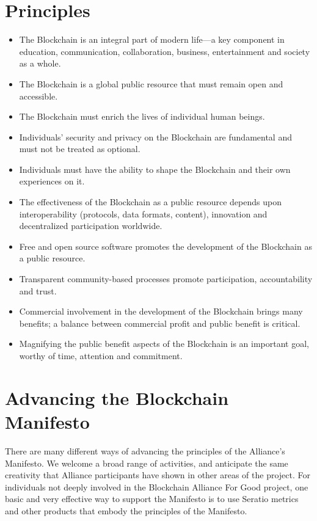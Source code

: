 \documentclass[twoside,twocolumn]{article}
\begin{document}
\section{Principles}
\begin{itemize}
  \item The Blockchain is an integral part of modern life—a key component in
  education, communication, collaboration, business, entertainment and society
  as a whole.
  \item The Blockchain is a global public resource that must remain open and
  accessible.
  \item The Blockchain must enrich the lives of individual human beings.
  \item Individuals’ security and privacy on the Blockchain are fundamental and
must not be treated as optional.
  \item Individuals must have the ability to shape the Blockchain and their own
experiences on it.
  \item The effectiveness of the Blockchain as a public resource depends upon
interoperability (protocols, data formats, content), innovation and
decentralized participation worldwide.
  \item Free and open source software promotes the development of the Blockchain
as a public resource.
  \item Transparent community-based processes promote participation,
  accountability and trust.
  \item Commercial involvement in the development of the Blockchain brings many
 benefits; a balance between commercial profit and public benefit is critical.
  \item Magnifying the public benefit aspects of the Blockchain is an important
   goal, worthy of time, attention and commitment.
\end{itemize}

\section{Advancing the Blockchain Manifesto}
There are many different ways of advancing the principles of the Alliance's
Manifesto. We welcome a broad range of activities, and anticipate the same
creativity that Alliance participants have shown in other areas of the project.
For individuals not deeply involved in the Blockchain Alliance For Good project,
one basic and very effective way to support the Manifesto is to use Seratio
metrics and other products that embody the principles of the Manifesto.
\end{document}
